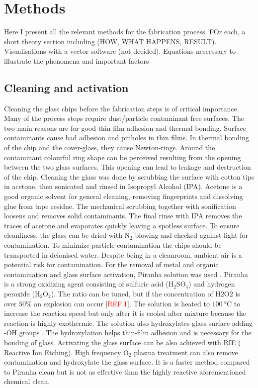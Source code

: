 \documentclass[final]{jyflluk}
\begin{document}


\section{Methods}
\label{sec:methods}

Here I present all the relevant methods for the fabrication process. FOr each, a short theory section including (HOW, WHAT HAPPENS, RESULT). Visualisations with a vector software (not decided). Equations  nescessary to illustrate the phenomena and important factors

\subsection{Cleaning and activation}
\label{sec:xx1}

Cleaning the glass chips before the fabrication steps is of critical importance. Many of the process steps require dust/particle contaminant free surfaces. The two main reasons are for good thin film adhesion and thermal bonding. Surface contaminants cause bad adhesion and pinholes in thin films. In thermal bonding of the chip and the cover-glass, they cause Newton-rings. Around the contaminant colourful ring shape can be perceived resulting from the opening between the two glass surfaces. This opening can lead to leakage and destruction of the chip.
Cleaning the glass was done by scrubbing the surface with cotton tips in acetone, then sonicated and rinsed in Isopropyl Alcohol (IPA). Acetone is a good organic solvent for general cleaning, removing fingerprints and dissolving glue from tape residue. The mechanical scrubbing together with sonification loosens and removes solid contaminants. The final rinse with IPA removes the traces of acetone and evaporates quickly leaving a spotless surface. To ensure cleanliness, the glass can be dried with $\mathrm{N_2}$ blowing and checked against light for contamination.  To minimize particle contamination the chips should be transported in deionised water. Despite being in a cleanroom, ambient air is a potential risk for contamination. 
For the removal of metal and organic contamination and glass surface activation, Piranha solution was used \cite{franssila2010introduction}. Piranha is a strong oxidizing agent consisting of sulfuric acid ($\mathrm{H_2 SO_4}$) and hydrogen peroxide ($\mathrm{H_2 O_2}$). The ratio can be tuned, but if the concentration of $\mathrm{H2O2}$ is over $50 \percent$ an explosion can occur [\textcolor{red}{REF.1}]. The solution is heated to $\SI{100}{\celsius}$ to increase the reaction speed but only after it is cooled after mixture because the reaction is highly exothermic. The solution also hydroxylates glass surface adding -OH groups \cite{klug2013chemical}. The hydroxylation helps thin-film adhesion and is necessary for the bonding of glass. Activating the glass surface can be also achieved with RIE ( Reactive Ion Etching)\cite{lazauskas2012float}. High frequency $\mathrm{O_2}$ plasma treatment can also remove contamination and  hydroxylate the glass surface. It is a faster method compared to Piranha clean but is not as effective than the highly reactive aforementioned chemical clean.
\end{document}
